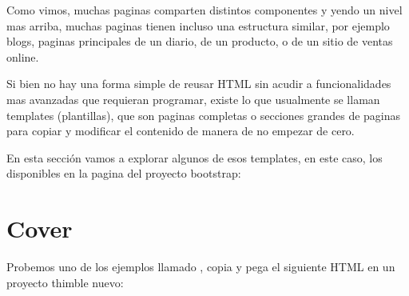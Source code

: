 \documentclass[letterpaper,10pt,spanish]{sphinxmanual}
\begin{document}
Como vimos, muchas paginas comparten distintos componentes y yendo un nivel
mas arriba, muchas paginas tienen incluso una estructura similar, por ejemplo
blogs, paginas principales de un diario, de un producto, o de un sitio de ventas
online.

Si bien no hay una forma simple de reusar HTML sin acudir a funcionalidades mas
avanzadas que requieran programar, existe lo que usualmente se llaman
templates (plantillas), que son paginas completas o secciones grandes de paginas para copiar
y modificar el contenido de manera de no empezar de cero.

En esta sección vamos a explorar algunos de esos templates, en este caso, los
disponibles en la pagina del proyecto bootstrap: 


\section{Cover}
\label{\detokenize{reusando-html-de-otros:cover}}
Probemos uno de los ejemplos llamado , copia y pega el siguiente HTML en
un proyecto thimble nuevo:
\end{document}
